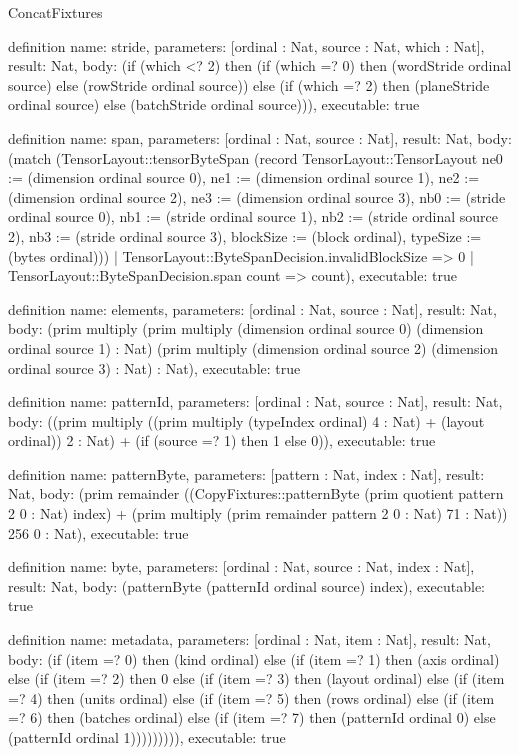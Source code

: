 \begin{lexlean}{ConcatFixtures}
\begin{semanticmodule}
definition{
  name: stride,
  parameters: [ordinal : Nat, source : Nat, which : Nat],
  result: Nat,
  body: (if (which <? 2) then (if (which =? 0) then (wordStride ordinal source) else (rowStride ordinal source)) else (if (which =? 2) then (planeStride ordinal source) else (batchStride ordinal source))),
  executable: true
}

definition{
  name: span,
  parameters: [ordinal : Nat, source : Nat],
  result: Nat,
  body: (match (TensorLayout::tensorByteSpan (record TensorLayout::TensorLayout {ne0 := (dimension ordinal source 0), ne1 := (dimension ordinal source 1), ne2 := (dimension ordinal source 2), ne3 := (dimension ordinal source 3), nb0 := (stride ordinal source 0), nb1 := (stride ordinal source 1), nb2 := (stride ordinal source 2), nb3 := (stride ordinal source 3), blockSize := (block ordinal), typeSize := (bytes ordinal)}))
    | TensorLayout::ByteSpanDecision.invalidBlockSize => 0
    | TensorLayout::ByteSpanDecision.span count => count),
  executable: true
}

definition{
  name: elements,
  parameters: [ordinal : Nat, source : Nat],
  result: Nat,
  body: (prim multiply (prim multiply (dimension ordinal source 0) (dimension ordinal source 1) : Nat) (prim multiply (dimension ordinal source 2) (dimension ordinal source 3) : Nat) : Nat),
  executable: true
}

definition{
  name: patternId,
  parameters: [ordinal : Nat, source : Nat],
  result: Nat,
  body: ((prim multiply ((prim multiply (typeIndex ordinal) 4 : Nat) + (layout ordinal)) 2 : Nat) + (if (source =? 1) then 1 else 0)),
  executable: true
}

definition{
  name: patternByte,
  parameters: [pattern : Nat, index : Nat],
  result: Nat,
  body: (prim remainder ((CopyFixtures::patternByte (prim quotient pattern 2 0 : Nat) index) + (prim multiply (prim remainder pattern 2 0 : Nat) 71 : Nat)) 256 0 : Nat),
  executable: true
}

definition{
  name: byte,
  parameters: [ordinal : Nat, source : Nat, index : Nat],
  result: Nat,
  body: (patternByte (patternId ordinal source) index),
  executable: true
}

definition{
  name: metadata,
  parameters: [ordinal : Nat, item : Nat],
  result: Nat,
  body: (if (item =? 0) then (kind ordinal) else (if (item =? 1) then (axis ordinal) else (if (item =? 2) then 0 else (if (item =? 3) then (layout ordinal) else (if (item =? 4) then (units ordinal) else (if (item =? 5) then (rows ordinal) else (if (item =? 6) then (batches ordinal) else (if (item =? 7) then (patternId ordinal 0) else (patternId ordinal 1))))))))),
  executable: true
}


\end{semanticmodule}
\end{lexlean}
